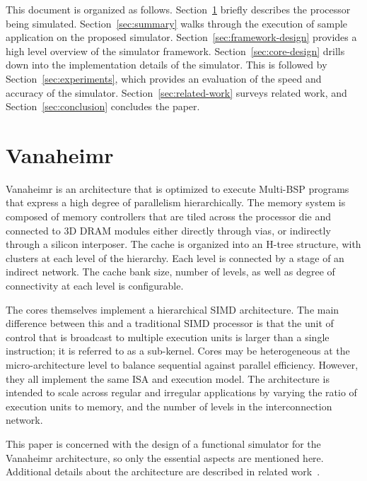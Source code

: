 \documentclass[conference, 10pt]{IEEEtran}
\begin{document}
This document is organized as follows.  
Section~\ref{sec:vanaheimr} briefly describes the processor being simulated.
Section~\ref{sec:summary} walks through the execution of sample application on
the proposed simulator.
Section~\ref{sec:framework-design} provides a high level overview of the 
simulator framework. 
Section~\ref{sec:core-design} drills down into the implementation details of 
the simulator.  
This is followed by Section~\ref{sec:experiments}, which provides an evaluation
of the speed and accuracy of the simulator.
Section~\ref{sec:related-work} surveys related work, and
Section~\ref{sec:conclusion} concludes the paper.


\section{Vanaheimr}
\label{sec:vanaheimr}

Vanaheimr is an architecture that is optimized to execute Multi-BSP programs
that express a high degree of parallelism hierarchically.  The memory system
is composed of memory controllers that are tiled across the processor die
and connected to 3D DRAM modules either directly through vias, or
indirectly through a silicon interposer.  The cache is organized
into an H-tree structure, with clusters at each level of the hierarchy.  Each
level is connected by a stage of an indirect network.  The cache bank size,
number of levels, as well as degree of connectivity at each level is
configurable.  

The cores themselves implement a hierarchical SIMD architecture.
The main difference between this and a traditional SIMD processor is that the
unit of control that is broadcast to multiple execution units is larger than
a single instruction; it is referred to as a sub-kernel.  Cores may be
heterogeneous at the micro-architecture level to balance sequential against
parallel efficiency.  However, they all implement the same ISA and execution 
model. The architecture is intended to scale across regular and irregular 
applications by varying the ratio of execution units to memory, and the number 
of levels in the interconnection network.  

This paper is concerned with the design of a functional simulator for the
Vanaheimr architecture, so only the essential aspects are mentioned here. 
Additional details about the architecture are described in related
work~\cite{ref:vanaheimr}.  
\end{document}
